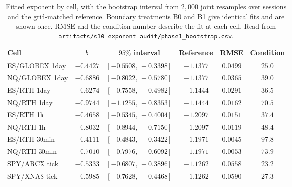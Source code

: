 \begin{table}[htbp]\centering\footnotesize
\caption{Fitted exponent by cell, with the bootstrap interval from $2{,}000$
joint resamples over sessions and the grid-matched reference. Boundary treatments
B0 and B1 give identical fits and are shown once. RMSE and the condition number
describe the fit at each cell. Read from
\texttt{artifacts/s10-exponent-audit/phase1\_bootstrap.csv}.}
\label{tab:exponent}
\begin{tabular}{lccccc}
\toprule
Cell & $b$ & $95\%$ interval & Reference & RMSE & Condition \\
\midrule
ES/GLOBEX 1day & $-0.4427$ & $[-0.5508,\,-0.3398]$ & $-1.1377$ & $0.0499$ & $25.0$ \\ %
NQ/GLOBEX 1day & $-0.6886$ & $[-0.8022,\,-0.5780]$ & $-1.1377$ & $0.0365$ & $39.0$ \\ %
ES/RTH 1day    & $-0.6274$ & $[-0.7558,\,-0.4982]$ & $-1.1444$ & $0.0291$ & $36.5$ \\ %
NQ/RTH 1day    & $-0.9744$ & $[-1.1255,\,-0.8353]$ & $-1.1444$ & $0.0162$ & $70.5$ \\ %
ES/RTH 1h      & $-0.4658$ & $[-0.5345,\,-0.4004]$ & $-1.2097$ & $0.0151$ & $37.4$ \\ %
NQ/RTH 1h      & $-0.8032$ & $[-0.8944,\,-0.7150]$ & $-1.2097$ & $0.0119$ & $48.4$ \\ %
ES/RTH 30min   & $-0.4111$ & $[-0.4843,\,-0.3422]$ & $-1.1971$ & $0.0045$ & $97.8$ \\ %
NQ/RTH 30min   & $-0.7010$ & $[-0.7976,\,-0.6092]$ & $-1.1971$ & $0.0053$ & $73.9$ \\ %
SPY/ARCX tick  & $-0.5333$ & $[-0.6807,\,-0.3896]$ & $-1.1262$ & $0.0558$ & $23.2$ \\ %
SPY/XNAS tick  & $-0.5985$ & $[-0.7628,\,-0.4468]$ & $-1.1262$ & $0.0590$ & $27.3$ \\ %
\bottomrule
\end{tabular}
\end{table}

